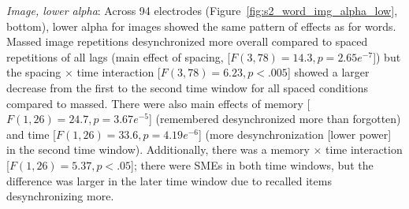 \textit{Image, lower alpha}: Across 94 electrodes (Figure~\ref{fig:s2_word_img_alpha_low}, bottom), lower alpha for images showed the same pattern of effects as for words.
Massed image repetitions desynchronized more overall compared to spaced repetitions of all lags (main effect of spacing, [$F(3,78)=14.3, p=2.65e^{-7}$]) but the spacing $\times$ time interaction [$F(3,78)=6.23, p<.005$] showed a larger decrease from the first to the second time window for all spaced conditions compared to massed.  There were also main effects of memory [$F(1,26)=24.7, p=3.67e^{-5}$] (remembered desynchronized more than forgotten) and time [$F(1,26)=33.6, p=4.19e^{-6}$] (more desynchronization [lower power] in the second time window).  Additionally, there was a memory $\times$ time interaction [$F(1,26)=5.37, p<.05$]; there were SMEs in both time windows, but the difference was larger in the later time window due to recalled items desynchronizing more.




